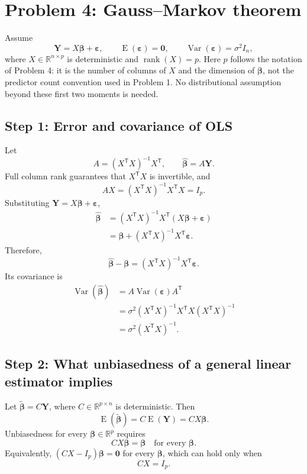 \documentclass[11pt]{article}
\newcommand{\trans}{\mathsf T}
\newcommand{\E}{\operatorname{E}}
\newcommand{\Var}{\operatorname{Var}}
\newcommand{\R}{\mathbb{R}}
\newcommand{\answer}[1]{\boxed{\displaystyle #1}}
\begin{document}
\clearpage
\section{Problem 4: Gauss--Markov theorem}

Assume
\[
\bm Y=X\bm\beta+\bm\varepsilon,
\qquad
\E(\bm\varepsilon)=\bm0,
\qquad
\Var(\bm\varepsilon)=\sigma^2I_n,
\]
where \(X\in\R^{n\times p}\) is deterministic and
\(\operatorname{rank}(X)=p\). Here \(p\) follows the notation of Problem 4:
it is the number of columns of \(X\) and the dimension of \(\bm\beta\), not
the predictor count convention used in Problem 1. No distributional assumption
beyond these first two moments is needed.

\subsection{Step 1: Error and covariance of OLS}

Let
\[
A=(X^\trans X)^{-1}X^\trans,
\qquad
\hat{\bm\beta}=A\bm Y.
\]
Full column rank guarantees that \(X^\trans X\) is invertible, and
\[
AX=(X^\trans X)^{-1}X^\trans X=I_p.
\]
Substituting \(\bm Y=X\bm\beta+\bm\varepsilon\),
\begin{align*}
\hat{\bm\beta}
&=(X^\trans X)^{-1}X^\trans(X\bm\beta+\bm\varepsilon)\\
&=\bm\beta+(X^\trans X)^{-1}X^\trans\bm\varepsilon.
\end{align*}
Therefore,
\[
\answer{\hat{\bm\beta}-\bm\beta
=(X^\trans X)^{-1}X^\trans\bm\varepsilon}.
\]
Its covariance is
\begin{align*}
\Var(\hat{\bm\beta})
&=A\Var(\bm\varepsilon)A^\trans\\
&=\sigma^2
(X^\trans X)^{-1}X^\trans X(X^\trans X)^{-1}\\
&=\answer{\sigma^2(X^\trans X)^{-1}}.
\end{align*}

\subsection{Step 2: What unbiasedness of a general linear estimator implies}

Let \(\tilde{\bm\beta}=C\bm Y\), where \(C\in\R^{p\times n}\) is deterministic.
Then
\[
\E(\tilde{\bm\beta})
=C\E(\bm Y)
=CX\bm\beta.
\]
Unbiasedness for every \(\bm\beta\in\R^p\) requires
\[
CX\bm\beta=\bm\beta
\quad\text{for every }\bm\beta.
\]
Equivalently, \((CX-I_p)\bm\beta=\bm0\) for every \(\bm\beta\), which can
hold only when
\[
\answer{CX=I_p}.
\]
\end{document}
